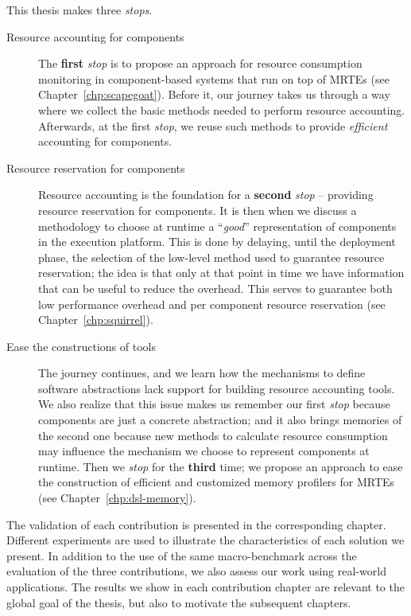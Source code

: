 This thesis makes three \textit{stops}.
\begin{description}
\item[Resource accounting for components] The \textbf{first} \textit{stop} is to propose an approach for resource consumption monitoring in component-based systems that run on top of MRTEs (see  Chapter~\ref{chp:scapegoat}).
Before it, our journey takes us through a way where we collect the basic methods needed to perform resource accounting.
Afterwards, at the first \textit{stop}, we reuse such methods to provide \textit{efficient} accounting for components.

\item[Resource reservation for components] Resource accounting is the foundation for a \textbf{second} \textit{stop} -- providing resource reservation for components.
It is then when we discuss a methodology to choose at runtime a ``\textit{good}'' representation of components in the execution platform.
This is done by delaying, until the deployment phase, the selection of the low-level method used to guarantee resource reservation; the idea is that only at that point in time we have information that can be useful to reduce the overhead.
This serves to guarantee both low performance overhead and per component resource reservation (see  Chapter~\ref{chp:squirrel}).

\item[Ease the constructions of tools] The journey continues, and we learn how the mechanisms to define software abstractions lack support for building resource accounting tools.
We also realize that this issue makes us remember our first \textit{stop} because components are just a concrete abstraction; and it also brings memories of the second one because new methods to calculate resource consumption may influence the mechanism we choose to represent components at runtime. 
Then we \textit{stop} for the \textbf{third} time; we propose an approach to ease the construction of efficient and customized memory profilers for MRTEs (see  Chapter~\ref{chp:dsl-memory}).
\end{description}

The validation of each contribution is presented in the corresponding chapter.
Different experiments are used to illustrate the characteristics of each solution we present.
In addition to the use of the same macro-benchmark across the evaluation of the three contributions, we also assess our work using real-world applications.
The results we show in each contribution chapter are relevant to the global goal of the thesis, but also to motivate the subsequent chapters.

\newpage\thispagestyle{empty}\addtocounter{page}{-1}



